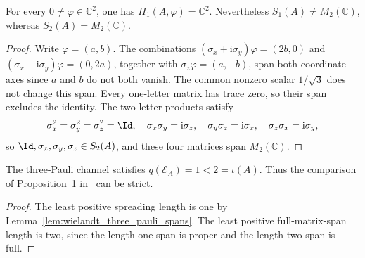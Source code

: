 \begin{lemma}
    \label{lem:wielandt_three_pauli_spans}
    \leanok
    For every $0\ne\varphi\in\mathbb C^2$, one has
    $H_1(A,\varphi)=\mathbb C^2$. Nevertheless $S_1(A)\ne M_2(\mathbb C)$,
    whereas $S_2(A)=M_2(\mathbb C)$.
\end{lemma}
\begin{proof}\leanok
    Write $\varphi=(a,b)$. The combinations
    $(\sigma_x+\mathrm i\sigma_y)\varphi=(2b,0)$ and
    $(\sigma_x-\mathrm i\sigma_y)\varphi=(0,2a)$, together with
    $\sigma_z\varphi=(a,-b)$, span both coordinate axes since $a$ and $b$
    do not both vanish. The common nonzero scalar $1/\sqrt3$ does not
    change this span. Every one-letter matrix has trace zero, so their span
    excludes the identity. The two-letter products satisfy
    \begin{align}
        \sigma_x^2=\sigma_y^2=\sigma_z^2=\Id,\quad
        \sigma_x\sigma_y=\mathrm i\sigma_z,\quad
        \sigma_y\sigma_z=\mathrm i\sigma_x,\quad
        \sigma_z\sigma_x=\mathrm i\sigma_y,
        \notag
    \end{align}
    so $\Id,\sigma_x,\sigma_y,\sigma_z\in S_2(A)$, and these four matrices
    span $M_2(\mathbb C)$.
\end{proof}

\begin{lemma}
    \label{thm:wielandt_three_pauli_indices}
    \leanok
    The three-Pauli channel satisfies $q(\mathcal E_A)=1<2=\iota(A)$.
    Thus the comparison of Proposition~1 in~\cite{Sanz2010Quantum} can be strict.
\end{lemma}
\begin{proof}\leanok
    The least positive spreading length is one by
    Lemma~\ref{lem:wielandt_three_pauli_spans}. The least positive
    full-matrix-span length is two, since the length-one span is proper
    and the length-two span is full.
\end{proof}


